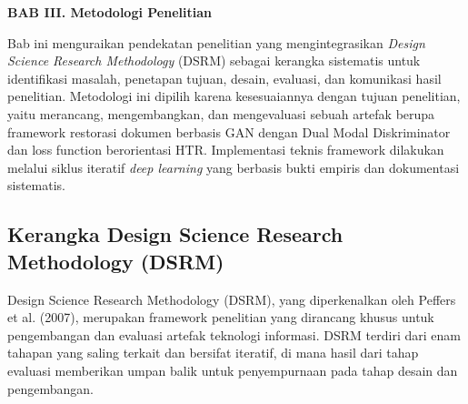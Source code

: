 \documentclass[12pt,a4paper]{article}
\begin{document}
\sloppy

\vspace{2cm}
\begin{center}
{\fontsize{14}{16.8}\selectfont\textbf{BAB III. Metodologi Penelitian}}\\[1em]
\end{center}
\label{sec:metodologi}
\setcounter{section}{3}
\setcounter{subsection}{0}
\vspace{2em}

Bab ini menguraikan pendekatan penelitian yang mengintegrasikan \textit{Design Science Research Methodology} (DSRM) sebagai kerangka sistematis untuk identifikasi masalah, penetapan tujuan, desain, evaluasi, dan komunikasi hasil penelitian. Metodologi ini dipilih karena kesesuaiannya dengan tujuan penelitian, yaitu merancang, mengembangkan, dan mengevaluasi sebuah artefak berupa framework restorasi dokumen berbasis GAN dengan Dual Modal Diskriminator dan loss function berorientasi HTR. Implementasi teknis framework dilakukan melalui siklus iteratif \textit{deep learning} yang berbasis bukti empiris dan dokumentasi sistematis.
\vspace{1em}
\subsection{Kerangka Design Science Research Methodology (DSRM)}
\label{subsec:dsrm-framework}
\vspace{0.8em}

Design Science Research Methodology (DSRM), yang diperkenalkan oleh Peffers et al. (2007), merupakan framework penelitian yang dirancang khusus untuk pengembangan dan evaluasi artefak teknologi informasi. DSRM terdiri dari enam tahapan yang saling terkait dan bersifat iteratif, di mana hasil dari tahap evaluasi memberikan umpan balik untuk penyempurnaan pada tahap desain dan pengembangan.
\end{document}
